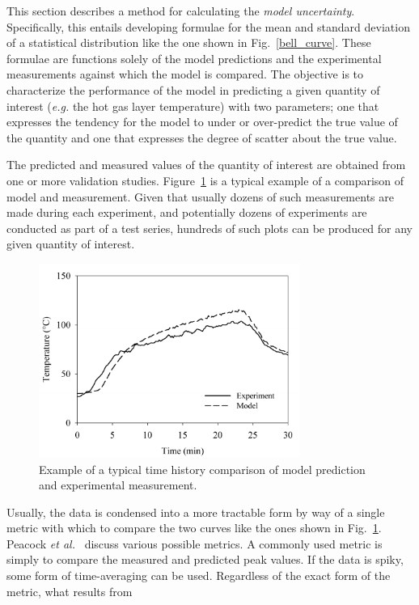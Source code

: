 This section describes a method for calculating the {\em model uncertainty}. Specifically, this entails developing formulae for
the mean and standard deviation of a statistical distribution like the one shown in Fig.~\ref{bell_curve}. These formulae are functions
solely of the model predictions and the experimental measurements against which the model is compared. The objective is to
characterize the performance of the model in predicting a given quantity of interest ({\em e.g.} the hot gas layer temperature) with two
parameters; one that expresses the tendency for the model to under or over-predict the true value of the quantity and one that expresses the degree of scatter
about the true value.

The predicted and measured values of the quantity of interest are obtained from one or more validation studies.
Figure~\ref{temp_history} is a typical example of a comparison of model and measurement. Given that usually
dozens of such measurements are made during each experiment,
and potentially dozens of experiments are conducted as part of a test series, hundreds of such plots can be
produced for any given quantity of interest.
\begin{figure}[ht]
\begin{center}
\includegraphics[height=2.5in]{FIGURES/sample_time_history}
\end{center}
\caption[Sample time history plots.]{Example of a typical time history comparison of model prediction and experimental measurement.}
\label{temp_history}
\end{figure}
Usually, the data is condensed into a more tractable form by way of a single metric with which to
compare the two curves like the ones shown in Fig.~\ref{temp_history}. Peacock {\em et al.}~\cite{Peacock:FSJ1999}
discuss various possible metrics. A commonly used metric is simply to compare the measured and predicted peak values.
If the data is spiky, some form of time-averaging can be used. Regardless of the exact form of the metric, what results from
